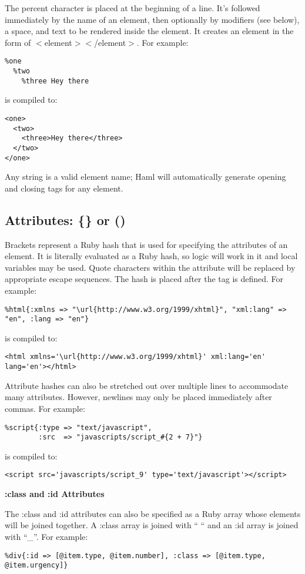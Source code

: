 \documentclass[9pt]{article}
\begin{document}
 The percent character is placed at the beginning of a line. It’s followed immediately by the name of an element, then optionally by modifiers (see below), a space, and text to be rendered inside the element. It creates an element in the form of $<$element$>$$<$/element$>$. For example:
\begin{verbatim}
%one
  %two
    %three Hey there
\end{verbatim}


 is compiled to:
\begin{verbatim}
<one>
  <two>
    <three>Hey there</three>
  </two>
</one>
\end{verbatim}


 Any string is a valid element name; Haml will automatically generate opening and closing tags for any element.
\subsection{Attributes: \{\} or ()}


 Brackets represent a Ruby hash that is used for specifying the attributes of an element. It is literally evaluated as a Ruby hash, so logic will work in it and local variables may be used. Quote characters within the attribute will be replaced by appropriate escape sequences. The hash is placed after the tag is defined. For example:
\begin{verbatim}
%html{:xmlns => "\url{http://www.w3.org/1999/xhtml}", "xml:lang" => "en", :lang => "en"}
\end{verbatim}


 is compiled to:
\begin{verbatim}
<html xmlns='\url{http://www.w3.org/1999/xhtml}' xml:lang='en' lang='en'></html>
\end{verbatim}


 Attribute hashes can also be stretched out over multiple lines to accommodate many attributes. However, newlines may only be placed immediately after commas. For example:
\begin{verbatim}
%script{:type => "text/javascript",
        :src  => "javascripts/script_#{2 + 7}"}
\end{verbatim}


 is compiled to:
\begin{verbatim}
<script src='javascripts/script_9' type='text/javascript'></script>
\end{verbatim}
\textbf{:class and :id Attributes}


 The :class and :id attributes can also be specified as a Ruby array whose elements will be joined together. A :class array is joined with `` `` and an :id array is joined with ``\_''. For example:
\begin{verbatim}
%div{:id => [@item.type, @item.number], :class => [@item.type, @item.urgency]}
\end{verbatim}
\end{document}
